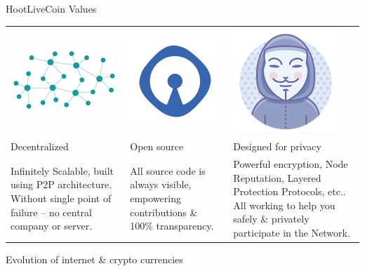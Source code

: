 \documentclass[10pt]{beamer}
\begin{document}
\begin{frame}[t]{HootLiveCoin Values}
\centering
\begin{adjustbox}{width=1\textwidth}
\begin{tabularx} {\textwidth}{|Y|Y|Y|}
 \hline
 \includegraphics[scale=0.3]{static/decentnew} & \includegraphics[scale=0.3]{static/opensource} & \includegraphics[scale=0.3]{static/privacy}\\ 
Decentralized & Open source & Designed for privacy\\
Infinitely Scalable, built using P2P architecture. Without single point of failure – no central company or server. & All source code is always visible, empowering contributions \& 100\% transparency. & Powerful encryption, Node Reputation, Layered Protection Protocols, etc.. All working to help you safely \& privately participate in the Network. \\
 \hline
\end{tabularx}
\end{adjustbox}

\end{frame}
 

\begin{frame}[t]{Evolution of internet \& crypto currencies}
 
 
\end{frame} 
 
\end{document}
